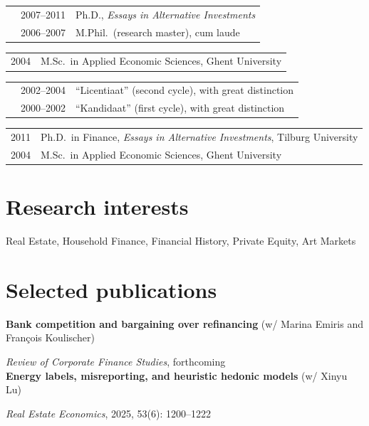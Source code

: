 \documentclass[a4paper]{article}
\begin{document}
\begin{tabular}{p{0.5cm} p{2cm} p{12.7cm}}
& 2007--2011 & Ph.D., {\em Essays in Alternative Investments}\\
& 2006--2007 & M.Phil.\ (research master), cum laude\\[0.25cm]
\end{tabular}

\begin{tabular}{p{1cm} p{14.7cm}}
2004 & M.Sc.\ in Applied Economic Sciences, Ghent University \\
\end{tabular}

\begin{tabular}{p{0.5cm} p{2cm} p{12.7cm}}
& 2002--2004 & ``Licentiaat'' (second cycle), with great distinction \\
& 2000--2002 & ``Kandidaat'' (first cycle), with great distinction \\
\end{tabular}
\fi 

\begin{tabular}{p{2cm} p{14.7cm}}
2011 & Ph.D.\ in Finance, {\em Essays in Alternative Investments}, Tilburg University\\ [0.25cm]

2004 & M.Sc.\ in Applied Economic Sciences, Ghent University 
\end{tabular}


\section*{Research interests}

Real Estate, Household Finance, Financial History, Private Equity, Art Markets



\section*{Selected publications}

\textbf{Bank competition and bargaining over refinancing} (w/ Marina Emiris and Fran\c{c}ois Koulischer) 

{\em Review of Corporate Finance Studies}, forthcoming \\

\textbf{Energy labels, misreporting, and heuristic hedonic models} (w/ Xinyu Lu) 

{\em Real Estate Economics}, 2025, 53(6): 1200--1222 \\
\end{document}
